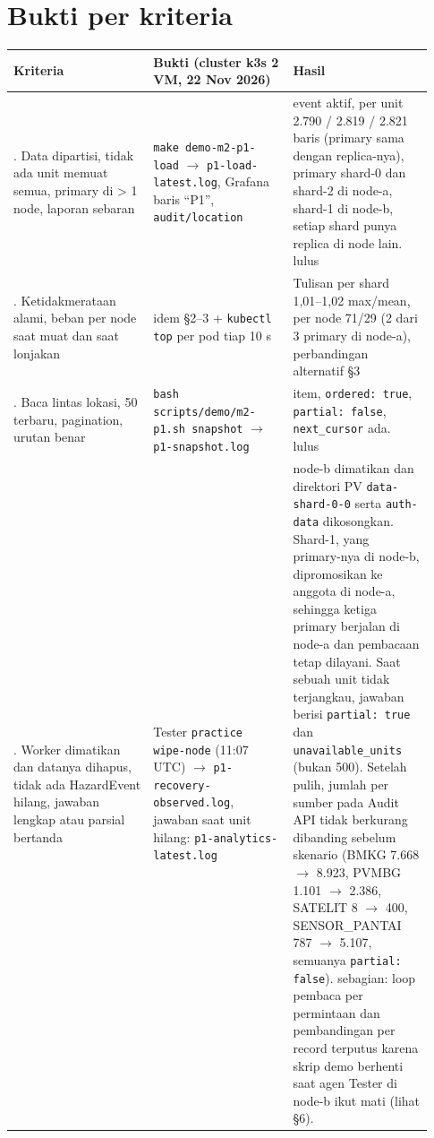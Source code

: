 \section{Bukti per kriteria}

{\small
\begin{longtable}{@{}>{\raggedright\arraybackslash}p{0.311\linewidth}>{\raggedright\arraybackslash}p{0.311\linewidth}>{\raggedright\arraybackslash}p{0.311\linewidth}@{}}
\toprule
\textbf{Kriteria} & \textbf{Bukti (cluster k3s 2 VM, 22 Nov 2026)} & \textbf{Hasil} \\
\midrule
\endhead
1. Data dipartisi, tidak ada unit memuat semua, primary di > 1 node, laporan sebaran & \texttt{make demo-\allowbreak{}m2-\allowbreak{}p1-\allowbreak{}load} $\rightarrow$ \texttt{p1-\allowbreak{}load-\allowbreak{}latest.\allowbreak{}log}, Grafana baris ``P1'', \texttt{audit/\allowbreak{}location} & 8.431 event aktif, per unit 2.790 / 2.819 / 2.821 baris (primary sama dengan replica-nya), primary shard-0 dan shard-2 di node-a, shard-1 di node-b, setiap shard punya replica di node lain. lulus \\
2. Ketidakmerataan alami, beban per node saat muat dan saat lonjakan & idem §2--3 + \texttt{kubectl top} per pod tiap 10 s & Tulisan per shard 1,01--1,02 max/mean, per node 71/29 (2 dari 3 primary di node-a), perbandingan alternatif §3 \\
3. Baca lintas lokasi, 50 terbaru, pagination, urutan benar & \texttt{bash scripts/\allowbreak{}demo/\allowbreak{}m2-\allowbreak{}p1.\allowbreak{}sh snapshot} $\rightarrow$ \texttt{p1-\allowbreak{}snapshot.\allowbreak{}log} & 50 item, \texttt{ordered: true}, \texttt{partial: false}, \texttt{next\_\allowbreak{}cursor} ada. lulus \\
4. Worker dimatikan dan datanya dihapus, tidak ada HazardEvent hilang, jawaban lengkap atau parsial bertanda & Tester \texttt{practice wipe-\allowbreak{}node} (11:07 UTC) $\rightarrow$ \texttt{p1-\allowbreak{}recovery-\allowbreak{}observed.\allowbreak{}log}, jawaban saat unit hilang: \texttt{p1-\allowbreak{}analytics-\allowbreak{}latest.\allowbreak{}log} & node-b dimatikan dan direktori PV \texttt{data-\allowbreak{}shard-\allowbreak{}0-\allowbreak{}0} serta \texttt{auth-\allowbreak{}data} dikosongkan. Shard-1, yang primary-nya di node-b, dipromosikan ke anggota di node-a, sehingga ketiga primary berjalan di node-a dan pembacaan tetap dilayani. Saat sebuah unit tidak terjangkau, jawaban berisi \texttt{partial: true} dan \texttt{unavailable\_\allowbreak{}units} (bukan 500). Setelah pulih, jumlah per sumber pada Audit API tidak berkurang dibanding sebelum skenario (BMKG 7.668 $\rightarrow$ 8.923, PVMBG 1.101 $\rightarrow$ 2.386, SATELIT 8 $\rightarrow$ 400, SENSOR\_PANTAI 787 $\rightarrow$ 5.107, semuanya \texttt{partial: false}). sebagian: loop pembaca per permintaan dan pembandingan per record terputus karena skrip demo berhenti saat agen Tester di node-b ikut mati (lihat §6). \\

\end{longtable}}
